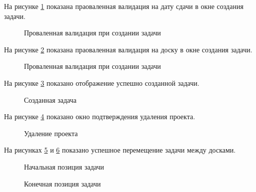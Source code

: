 На рисунке \ref{задача_некорректно_дата:image} показана праоваленная валидация на дату сдачи в окне создания задачи.

\begin{figure}[ht]
	\caption{Проваленная валидация при создании задачи}
	\label{задача_некорректно_дата:image}
\end{figure}

На рисунке \ref{задача_некорректно_доска:image} показана праоваленная валидация на доску в окне создания задачи.

\begin{figure}[ht]
	\caption{Проваленная валидация при создании задачи}
	\label{задача_некорректно_доска:image}
\end{figure}

На рисунке \ref{задача_успешно:image} показано отображение успешно созданной задачи.

\begin{figure}[ht]
	\caption{Созданная задача}
	\label{задача_успешно:image}
\end{figure}

На рисунке \ref{проект_подтверждение_удаления:image} показано окно подтверждения удаления проекта.

\begin{figure}[ht]
	\caption{Удаление проекта}
	\label{проект_подтверждение_удаления:image}
\end{figure}

На рисунках \ref{перетаскивание_задачи_1:image} и \ref{перетаскивание_задачи_2:image} показано успешное перемещение задачи между досками.

\newpage

\begin{figure}[ht]
	\caption{Начальная позиция задачи}
	\label{перетаскивание_задачи_1:image}
\end{figure}

\begin{figure}[ht]
	\caption{Конечная позиция задачи}
	\label{перетаскивание_задачи_2:image}
\end{figure}

